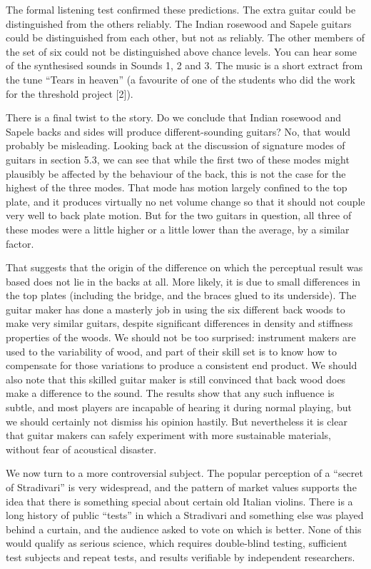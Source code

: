   The formal listening test confirmed these predictions. The extra guitar could 
  be distinguished from the others reliably. The Indian rosewood and Sapele 
  guitars could be distinguished from each other, but not as reliably. The 
  other members of the set of six could not be distinguished above chance 
  levels. You can hear some of the synthesised sounds in Sounds 1, 2 and 3. The 
  music is a short extract from the tune “Tears in heaven” (a favourite of one 
  of the students who did the work for the threshold project [2]). 

  There is a final twist to the story. Do we conclude that Indian rosewood and 
  Sapele backs and sides will produce different-sounding guitars? No, that 
  would probably be misleading. Looking back at the discussion of signature 
  modes of guitars in section 5.3, we can see that while the first two of these 
  modes might plausibly be affected by the behaviour of the back, this is not 
  the case for the highest of the three modes. That mode has motion largely 
  confined to the top plate, and it produces virtually no net volume change so 
  that it should not couple very well to back plate motion. But for the two 
  guitars in question, all three of these modes were a little higher or a 
  little lower than the average, by a similar factor. 

  That suggests that the origin of the difference on which the perceptual 
  result was based does not lie in the backs at all. More likely, it is due to 
  small differences in the top plates (including the bridge, and the braces 
  glued to its underside). The guitar maker has done a masterly job in using 
  the six different back woods to make very similar guitars, despite 
  significant differences in density and stiffness properties of the woods. We 
  should not be too surprised: instrument makers are used to the variability of 
  wood, and part of their skill set is to know how to compensate for those 
  variations to produce a consistent end product. We should also note that this 
  skilled guitar maker is still convinced that back wood does make a difference 
  to the sound. The results show that any such influence is subtle, and most 
  players are incapable of hearing it during normal playing, but we should 
  certainly not dismiss his opinion hastily. But nevertheless it is clear that 
  guitar makers can safely experiment with more sustainable materials, without 
  fear of acoustical disaster. 

  We now turn to a more controversial subject. The popular perception of a 
  “secret of Stradivari” is very widespread, and the pattern of market values 
  supports the idea that there is something special about certain old Italian 
  violins. There is a long history of public “tests” in which a Stradivari and 
  something else was played behind a curtain, and the audience asked to vote on 
  which is better. None of this would qualify as serious science, which 
  requires double-blind testing, sufficient test subjects and repeat tests, and 
  results verifiable by independent researchers. 

